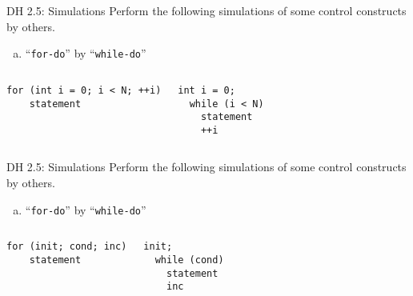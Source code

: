 
\begin{frame}{}
\end{frame}

\begin{frame}[fragile]{}
  \begin{exampleblock}{DH 2.5: Simulations}
    Perform the following simulations of some control constructs by others.
    \begin{enumerate}[(a)]
      \item ``\texttt{for-do}'' by ``\texttt{while-do}''
    \end{enumerate}
  \end{exampleblock}

  \vspace{0.40cm}
  \begin{columns}
    \pause
  \begin{lstlisting}[style = Cstyle, backgroundcolor = \color{teal!10!lightgray}]
  for (int i = 0; i < N; ++i)
    statement
  \end{lstlisting}
    \pause
  \begin{lstlisting}[style = Cstyle]
  int i = 0;
  while (i < N)
    statement
    ++i
  \end{lstlisting}
  \end{columns}

  \pause
  \begin{center}
  \end{center}
\end{frame}
\begin{frame}[fragile]{}
  \begin{exampleblock}{DH 2.5: Simulations}
    Perform the following simulations of some control constructs by others.
    \begin{enumerate}[(a)]
      \item ``\texttt{for-do}'' by ``\texttt{while-do}''
    \end{enumerate}
  \end{exampleblock}

  \begin{columns}
      \begin{lstlisting}[style = Cstyle, backgroundcolor = \color{teal!10!lightgray}]
  for (init; cond; inc)
    statement
      \end{lstlisting}
      \begin{lstlisting}[style = Cstyle]
  init;
  while (cond)
    statement
    inc
      \end{lstlisting}
  \end{columns}
\end{frame}

